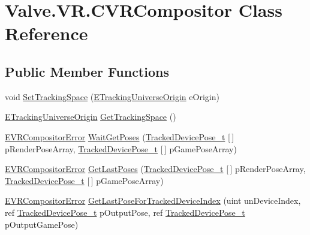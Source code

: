 \hypertarget{class_valve_1_1_v_r_1_1_c_v_r_compositor}{}\section{Valve.\+V\+R.\+C\+V\+R\+Compositor Class Reference}
\label{class_valve_1_1_v_r_1_1_c_v_r_compositor}
\subsection*{Public Member Functions}
\begin{DoxyCompactItemize}
\item 
void \mbox{\hyperlink{class_valve_1_1_v_r_1_1_c_v_r_compositor_a6449a49b452246bc9275562c06ff98c6}{Set\+Tracking\+Space}} (\mbox{\hyperlink{namespace_valve_1_1_v_r_a29be99a3c2f780157bd490db06a7f12f}{E\+Tracking\+Universe\+Origin}} e\+Origin)
\item 
\mbox{\hyperlink{namespace_valve_1_1_v_r_a29be99a3c2f780157bd490db06a7f12f}{E\+Tracking\+Universe\+Origin}} \mbox{\hyperlink{class_valve_1_1_v_r_1_1_c_v_r_compositor_a37b4fe9a440cd92ad46659a5f809ecbd}{Get\+Tracking\+Space}} ()
\item 
\mbox{\hyperlink{namespace_valve_1_1_v_r_ac34ee1034fda668ccd45f57676ded81b}{E\+V\+R\+Compositor\+Error}} \mbox{\hyperlink{class_valve_1_1_v_r_1_1_c_v_r_compositor_a4c8b57832b7579ed1485d6b1282bfc18}{Wait\+Get\+Poses}} (\mbox{\hyperlink{struct_valve_1_1_v_r_1_1_tracked_device_pose__t}{Tracked\+Device\+Pose\+\_\+t}} \mbox{[}$\,$\mbox{]} p\+Render\+Pose\+Array, \mbox{\hyperlink{struct_valve_1_1_v_r_1_1_tracked_device_pose__t}{Tracked\+Device\+Pose\+\_\+t}} \mbox{[}$\,$\mbox{]} p\+Game\+Pose\+Array)
\item 
\mbox{\hyperlink{namespace_valve_1_1_v_r_ac34ee1034fda668ccd45f57676ded81b}{E\+V\+R\+Compositor\+Error}} \mbox{\hyperlink{class_valve_1_1_v_r_1_1_c_v_r_compositor_a6d410c16e1f6335e331b5610ded87500}{Get\+Last\+Poses}} (\mbox{\hyperlink{struct_valve_1_1_v_r_1_1_tracked_device_pose__t}{Tracked\+Device\+Pose\+\_\+t}} \mbox{[}$\,$\mbox{]} p\+Render\+Pose\+Array, \mbox{\hyperlink{struct_valve_1_1_v_r_1_1_tracked_device_pose__t}{Tracked\+Device\+Pose\+\_\+t}} \mbox{[}$\,$\mbox{]} p\+Game\+Pose\+Array)
\item 
\mbox{\hyperlink{namespace_valve_1_1_v_r_ac34ee1034fda668ccd45f57676ded81b}{E\+V\+R\+Compositor\+Error}} \mbox{\hyperlink{class_valve_1_1_v_r_1_1_c_v_r_compositor_aeeee06f40622e4a4bea086266d4b73b4}{Get\+Last\+Pose\+For\+Tracked\+Device\+Index}} (uint un\+Device\+Index, ref \mbox{\hyperlink{struct_valve_1_1_v_r_1_1_tracked_device_pose__t}{Tracked\+Device\+Pose\+\_\+t}} p\+Output\+Pose, ref \mbox{\hyperlink{struct_valve_1_1_v_r_1_1_tracked_device_pose__t}{Tracked\+Device\+Pose\+\_\+t}} p\+Output\+Game\+Pose)

\end{DoxyCompactItemize}
